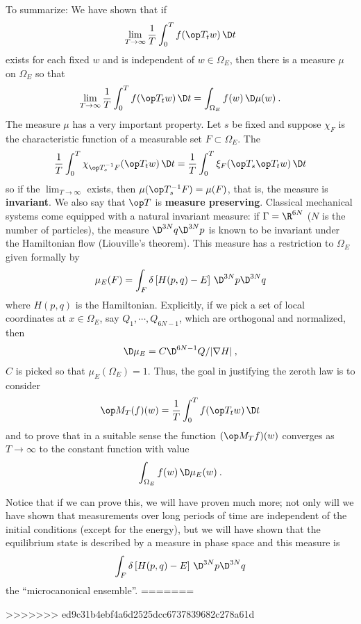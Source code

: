 To summarize: We have shown that if
\begin{align}
    \lim_{T \rightarrow \infty} \frac{1}{T} \int_0^T f(\op T_t w) \, \D t
\end{align}
exists for each fixed $w$ and is independent of $w \in \Omega_E$, then there is a measure $\mu$ on $\Omega_E$ so that
\begin{align}
    \lim_{T \rightarrow \infty} \frac{1}{T} \int_0^T f(\op T_t w) \, \D t = \int_{\Omega_E} f(w) \, \D \mu(w) \:.
\end{align}
The measure $\mu$ has a very important property. Let $s$ be fixed and suppose $\chi_F$ is the characteristic function of a measurable set $F \subset \Omega_E$. The \begin{align}
    \frac{1}{T} \int_0^T \chi_{\op T_s^{-1} F} (\op T_t w) \, \D t = \frac{1}{T} \int_0^T \xi_F (\op T_s \op T_t w) \, \D t
\end{align}
so if the $\lim_{T \rightarrow \infty}$ exists, then $\mu(\op T_s^{-1}F) = \mu(F)$, that is, the measure is \textbf{invariant}. We also say that $\op T$ is \textbf{measure preserving}. Classical mechanical systems come equipped with a natural invariant measure: if $\Gamma = \R^{6N}$ ($N$ is the number of particles), the measure $\D^{3N} q \D^{3N} p$ is known to be invariant under the Hamiltonian flow (Liouville’s theorem). This measure has a restriction to $\Omega_E$ given formally by
\begin{align}
    \mu_E(F) = \int_F \delta \left[ H(p,q) - E \right] \, \D^{3N} p \D^{3N} q
\end{align}
where $H(p,q)$ is the Hamiltonian.
Explicitly, if we pick a set of local coordinates at $x \in \Omega_E$, say $Q_1, \cdots, Q_{6N-1}$, which are orthogonal and normalized, then
\begin{align}
    \D \mu_E = C \D^{6N-1} Q/ |\nabla H| \:,
\end{align}
$C$ is picked so that $\mu_E(\Omega_E) = 1$. Thus, the goal in justifying the zeroth law is to consider \begin{align}
    \op M_T(f)(w) = \frac{1}{T} \int_0^T f(\op T_t w) \, \D t
\end{align}
and to prove that in a suitable sense the function $(\op M_T f)(w)$ converges as $T \rightarrow \infty$ to the constant function with value
\begin{align}
    \int_{\Omega_E} f(w) \, \D \mu_E(w) \:.
\end{align}

Notice that if we can prove this, we will have proven much more; not only will we have shown that measurements over long periods of time are independent of the initial conditions (except for the energy), but we will have shown that the equilibrium state is described by a measure in phase space and this measure is
\begin{align}
    \int_F \delta \left[ H(p,q) - E \right] \, \D^{3N} p \D^{3N} q
\end{align}
the \enquote{microcanonical ensemble}.
=======

>>>>>>> ed9c31b4ebf4a6d2525dcc6737839682c278a61d
